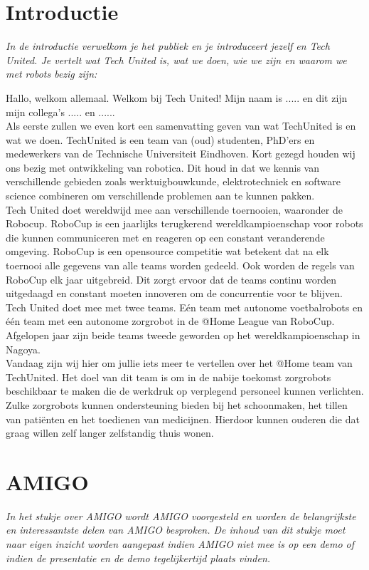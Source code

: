 \documentclass[a4paper,10pt]{article}
\numberwithin{equation}{section}
\numberwithin{figure}{section}
\numberwithin{table}{section}
\begin{document}
\section*{Introductie}
\textit{In de introductie verwelkom je het publiek en je introduceert jezelf en Tech United. Je vertelt wat Tech United is, wat we doen, wie we zijn en waarom we met robots bezig zijn:}\

Hallo, welkom allemaal. Welkom bij Tech United! Mijn naam is ..... en dit zijn mijn collega’s ..... en ...... \\

Als eerste zullen we even kort een samenvatting geven van wat TechUnited is en wat we doen. TechUnited is een team van (oud) studenten, PhD'ers en medewerkers van de Technische Universiteit Eindhoven. Kort gezegd houden wij ons bezig met ontwikkeling van robotica. Dit houd in dat we kennis van verschillende gebieden zoals werktuigbouwkunde, elektrotechniek en software science combineren om verschillende problemen aan te kunnen pakken.\\

Tech United doet wereldwijd mee aan verschillende toernooien, waaronder de Robocup. RoboCup is een jaarlijks terugkerend wereldkampioenschap voor robots die kunnen communiceren met en reageren op een constant veranderende omgeving. RoboCup is een opensource competitie wat betekent dat na elk toernooi alle gegevens van alle teams worden gedeeld. Ook worden de regels van RoboCup elk jaar uitgebreid. Dit zorgt ervoor dat de teams continu worden uitgedaagd en constant moeten innoveren om de concurrentie voor te blijven.\\

Tech United doet mee met twee teams. Eén team met autonome voetbalrobots en één team met een autonome zorgrobot in de @Home League van RoboCup. Afgelopen jaar zijn beide teams tweede geworden op het wereldkampioenschap in Nagoya.\\

Vandaag zijn wij hier om jullie iets meer te vertellen over het @Home team van TechUnited. Het doel van dit team is om in de nabije toekomst zorgrobots beschikbaar te maken die de werkdruk op verplegend personeel kunnen verlichten. Zulke zorgrobots kunnen  ondersteuning bieden bij het schoonmaken, het tillen van patiënten en het toedienen van medicijnen. Hierdoor kunnen ouderen die dat graag willen zelf langer zelfstandig thuis wonen. 

\section*{AMIGO}
\textit{In het stukje over AMIGO wordt AMIGO voorgesteld en worden de belangrijkste en interessantste delen van AMIGO besproken. De inhoud van dit stukje moet naar eigen inzicht worden aangepast indien AMIGO niet mee is op een demo of indien de presentatie en de demo tegelijkertijd plaats vinden. }\\
\end{document}

